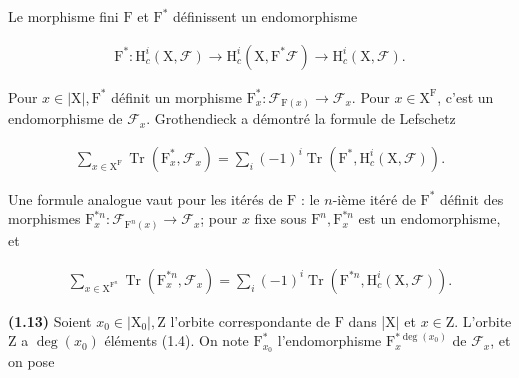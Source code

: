 \documentclass[10pt,leqno]{article}
\begin{document}
\noindent Le morphisme fini \(\mathrm{F}\) et \(\mathrm{F}^{*}\) définissent un endomorphisme\par

\begin{equation*}\begin{gathered}\mathrm{F}^{*} : \mathrm{H}_{c}^{i}(\mathrm{X},\mathcal{F} ) \longrightarrow  \mathrm{H}_{c}^{i}(\mathrm{X},\mathrm{F}^{*}\mathcal{F} ) \longrightarrow  \mathrm{H}_{c}^{i}(\mathrm{X},\mathcal{F} ).\end{gathered}\end{equation*}

\noindent Pour \(x\in |\mathrm{X}|, \mathrm{F}^{*}\) définit un morphisme \(\mathrm{F}_{x}^{*} : \mathcal{F} _{\mathrm{F}(x)}\longrightarrow \mathcal{F} _{x}\). Pour \(x\in \mathrm{X}^{\mathrm{F}}\), c’est un endomorphisme de \(\mathcal{F} _{x}\). Grothendieck a démontré la formule de Lefschetz\par

\begin{equation*}\begin{gathered}\sum _{x\in \mathrm{X}^{\mathrm{F}}} \operatorname{Tr}(\mathrm{F}_{x}^{*},\mathcal{F} _{x}) = \sum _{i} (- 1)^{i} \operatorname{Tr}(\mathrm{F}^{*},\mathrm{H}_{c}^{i}(\mathrm{X},\mathcal{F} )).\end{gathered}\end{equation*}

\noindent Une formule analogue vaut pour les itérés de \(\mathrm{F}\) : le \(n\)-ième itéré de \(\mathrm{F}^{*}\) définit des morphismes \(\mathrm{F}_{x}^{*n} : \mathcal{F} _{\mathrm{F}^{n}(x)}\longrightarrow \mathcal{F} _{x}\); pour \(x\) fixe sous \(\mathrm{F}^{n}, \mathrm{F}_{x}^{*n}\) est un endomorphisme, et\par

\begin{equation*}\begin{gathered}\sum _{x\in \mathrm{X}^{\mathrm{F}^{n}}} \operatorname{Tr}(\mathrm{F}_{x}^{*n},\mathcal{F} _{x}) = \sum _{i} (- 1)^{i} \operatorname{Tr}(\mathrm{F}^{*n},\mathrm{H}_{c}^{i}(\mathrm{X},\mathcal{F} )).\end{gathered}\tag{1.12.1}\end{equation*}

\noindent \textbf{(1.13)} Soient \(x_{0}\in |\mathrm{X}_{0}|, \mathrm{Z}\) l’orbite correspondante de \(\mathrm{F}\) dans |\(\mathrm{X}|\) et \(x\in \mathrm{Z}\). L’orbite \(\mathrm{Z}\) a \(\operatorname{deg}(x_{0})\) éléments (1.4). On note \(\mathrm{F}_{x_{0}}^{*}\) l’endomorphisme \(\mathrm{F}_{x}^{*\operatorname{deg}(x_{0})}\) de \(\mathcal{F} _{x}\), et on pose\par
\end{document}
